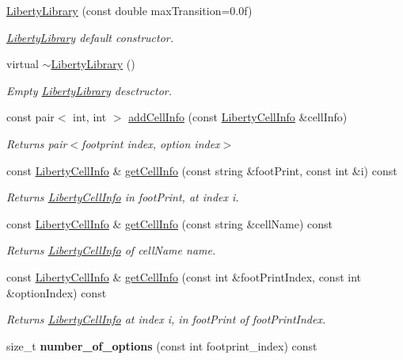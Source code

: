 \begin{DoxyCompactItemize}
\item 
\hyperlink{classLibertyLibrary_a3b7513ef68e791245f60e16f6b4ee5d4}{Liberty\-Library} (const double max\-Transition=0.\-0f)
\begin{DoxyCompactList}\small\item\em \hyperlink{classLibertyLibrary}{Liberty\-Library} default constructor. \end{DoxyCompactList}\item 
virtual \hyperlink{classLibertyLibrary_ade99b2247c7d5eb9ef885bc4ec57091d}{$\sim$\-Liberty\-Library} ()
\begin{DoxyCompactList}\small\item\em Empty \hyperlink{classLibertyLibrary}{Liberty\-Library} desctructor. \end{DoxyCompactList}\item 
const pair$<$ int, int $>$ \hyperlink{classLibertyLibrary_a4d9ec0ea6af3949878d9b14042e761e6}{add\-Cell\-Info} (const \hyperlink{structLibertyCellInfo}{Liberty\-Cell\-Info} \&cell\-Info)
\begin{DoxyCompactList}\small\item\em Returns pair$<$footprint index, option index$>$ \end{DoxyCompactList}\item 
const \hyperlink{structLibertyCellInfo}{Liberty\-Cell\-Info} \& \hyperlink{classLibertyLibrary_a917ae50f0af17b1b68be754f1ae6dd07}{get\-Cell\-Info} (const string \&foot\-Print, const int \&i) const 
\begin{DoxyCompactList}\small\item\em Returns \hyperlink{structLibertyCellInfo}{Liberty\-Cell\-Info} in foot\-Print, at index i. \end{DoxyCompactList}\item 
const \hyperlink{structLibertyCellInfo}{Liberty\-Cell\-Info} \& \hyperlink{classLibertyLibrary_a57c64ca6abd02f1e549eeb25178724c9}{get\-Cell\-Info} (const string \&cell\-Name) const 
\begin{DoxyCompactList}\small\item\em Returns \hyperlink{structLibertyCellInfo}{Liberty\-Cell\-Info} of cell\-Name name. \end{DoxyCompactList}\item 
const \hyperlink{structLibertyCellInfo}{Liberty\-Cell\-Info} \& \hyperlink{classLibertyLibrary_a227638e4b3a4b00faa659c45e20c0aaa}{get\-Cell\-Info} (const int \&foot\-Print\-Index, const int \&option\-Index) const 
\begin{DoxyCompactList}\small\item\em Returns \hyperlink{structLibertyCellInfo}{Liberty\-Cell\-Info} at index i, in foot\-Print of foot\-Print\-Index. \end{DoxyCompactList}\item 
\hypertarget{classLibertyLibrary_a411ffb8700a4dc393650ec341f33a2a7}{size\-\_\-t {\bfseries number\-\_\-of\-\_\-options} (const int footprint\-\_\-index) const }\label{classLibertyLibrary_a411ffb8700a4dc393650ec341f33a2a7}


\end{DoxyCompactItemize}
